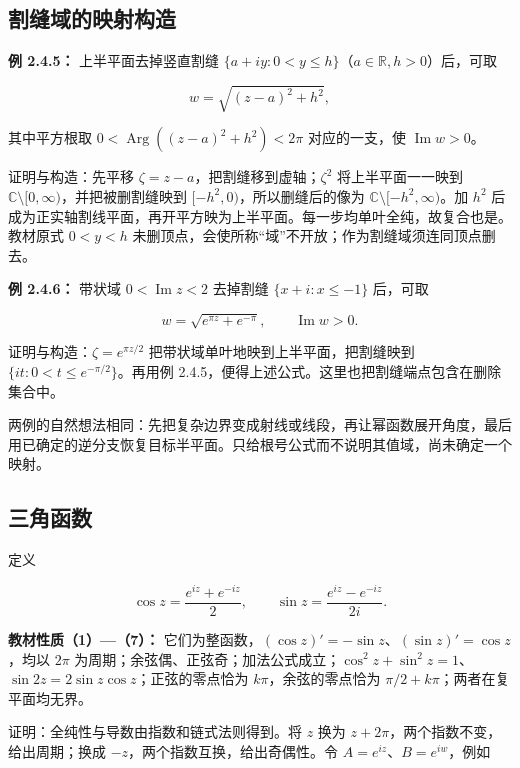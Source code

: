 \documentclass[11pt,a4paper]{article}
\begin{document}
\subsection{割缝域的映射构造}\label{ch02-s4-ux5272ux7f1dux57dfux7684ux6620ux5c04ux6784ux9020}

\textbf{例 2.4.5：} 上半平面去掉竖直割缝
\(\{a+iy:0<y\le h\}\)（\(a\in\mathbb R,h>0\)）后，可取

\[
w=\sqrt{(z-a)^2+h^2},
\]

其中平方根取 \(0<\operatorname{Arg}((z-a)^2+h^2)<2\pi\) 对应的一支，使
\(\operatorname{Im}w>0\)。

证明与构造：先平移 \(\zeta=z-a\)，把割缝移到虚轴；\(\zeta^2\)
将上半平面一一映到 \(\mathbb C\setminus[0,\infty)\)，并把被删割缝映到
\([-h^2,0)\)，所以删缝后的像为 \(\mathbb C\setminus[-h^2,\infty)\)。加
\(h^2\)
后成为正实轴割线平面，再开平方映为上半平面。每一步均单叶全纯，故复合也是。教材原式
\(0<y<h\) 未删顶点，会使所称``域''不开放；作为割缝域须连同顶点删去。

\textbf{例 2.4.6：} 带状域 \(0<\operatorname{Im}z<2\) 去掉割缝
\(\{x+i:x\le-1\}\) 后，可取

\[
w=\sqrt{e^{\pi z}+e^{-\pi}},\qquad \operatorname{Im}w>0.
\]

证明与构造：\(\zeta=e^{\pi z/2}\) 把带状域单叶地映到上半平面，把割缝映到
\(\{it:0<t\le e^{-\pi/2}\}\)。再用例
2.4.5，便得上述公式。这里也把割缝端点包含在删除集合中。

两例的自然想法相同：先把复杂边界变成射线或线段，再让幂函数展开角度，最后用已确定的逆分支恢复目标半平面。只给根号公式而不说明其值域，尚未确定一个映射。

\subsection{三角函数}\label{ch02-s4-ux4e09ux89d2ux51fdux6570}

定义

\[
\cos z=\frac{e^{iz}+e^{-iz}}2,\qquad
\sin z=\frac{e^{iz}-e^{-iz}}{2i}.
\]

\textbf{教材性质（1）---（7）：}
它们为整函数，\((\cos z)'=-\sin z\)、\((\sin z)'=\cos z\)，均以 \(2\pi\)
为周期；余弦偶、正弦奇；加法公式成立；\(\cos^2z+\sin^2z=1\)、\(\sin2z=2\sin z\cos z\)；正弦的零点恰为
\(k\pi\)，余弦的零点恰为 \(\pi/2+k\pi\)；两者在复平面均无界。

证明：全纯性与导数由指数和链式法则得到。将 \(z\) 换为
\(z+2\pi\)，两个指数不变，给出周期；换成
\(-z\)，两个指数互换，给出奇偶性。令 \(A=e^{iz}\)、\(B=e^{iw}\)，例如
\end{document}
